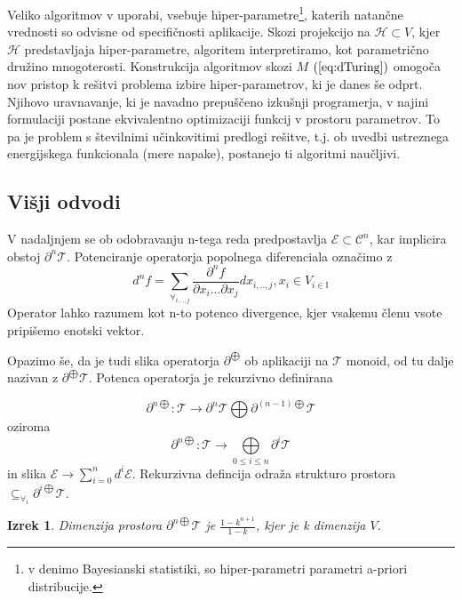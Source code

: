 \documentclass{article}
\newcommand{\II}{\mathbb{I}}
\newcommand{\E}{\mathcal{E}}
\newcommand{\T}{\mathcal{T}}
\newcommand{\Op}{\partial^{\bigoplus}}
\newcommand{\op}[1]{\partial^{#1\bigoplus}}
\newtheorem{izrek}{Izrek}[section]
\begin{document}
  Veliko algoritmov v uporabi, vsebuje hiper-parametre\footnote[2]{v denimo Bayesianski statistiki, so hiper-parametri parametri a-priori distribucije.}, katerih natančne vrednosti so odvisne od specifičnosti aplikacije. Skozi projekcijo na $\mathcal{H}\subset V$, kjer $\mathcal{H}$ predstavljaja hiper-parametre, algoritem interpretiramo, kot parametrično družino mnogoterosti. Konstrukcija algoritmov skozi $M$ $(\ref{eq:dTuring})$ omogoča nov pristop k rešitvi problema izbire hiper-parametrov, ki je danes še odprt. Njihovo uravnavanje, ki je navadno prepuščeno izkušnji programerja, v najini formulaciji postane ekvivalentno optimizaciji funkcij v prostoru parametrov. To pa je problem s številnimi učinkovitimi predlogi rešitve, t.j. ob uvedbi ustreznega energijskega funkcionala (mere napake), postanejo ti algoritmi naučljivi.
 
 \subsection{Višji odvodi}
 
 V nadaljnjem se ob odobravanju n-tega reda predpostavlja $\E\subset\mathcal{C}^n$, kar implicira obstoj $\partial^n\T$. Potenciranje operatorja popolnega diferenciala označimo z
 $$d^nf=\sum_{\forall_{i,..,j}}\frac{\partial^n f}{\partial x_i...\partial x_j}dx_{i,..,j}, x_i\in V_{i\in\II}$$
 Operator lahko razumem kot n-to potenco divergence, kjer vsakemu členu vsote pripišemo enotski vektor.
 
 Opazimo še, da je tudi slika operatorja $\partial^{\bigoplus}$ ob aplikaciji na $\T$ monoid, od tu dalje nazivan z $\partial^{\bigoplus}\T$. Potenca operatorja je rekurzivno definirana
 
 \begin{equation}\label{eq:dirSumFunNRek}
	\partial^{n\bigoplus}:\T\to\partial^{n}\T\bigoplus\partial^{(n-1)\bigoplus}\T
 \end{equation}
 oziroma
 \begin{equation}\label{eq:dirSumFunN}
 	\partial^{n\bigoplus}:\T\to\bigoplus\limits_{0\leq i\leq n}\partial^{i}\T
  \end{equation}
 in slika $\E\to\sum\limits_{i=0}^nd^i\E$. Rekurzivna defincija odraža strukturo prostora $\subseteq_{\forall_i}\op{i}\T$.
 \begin{izrek}
 Dimenzija prostora $\op{n}\T$ je $\frac{1-k^{n+1}}{1-k}$, kjer je k dimenzija $V$.
 \end{izrek}
 
\end{document}
